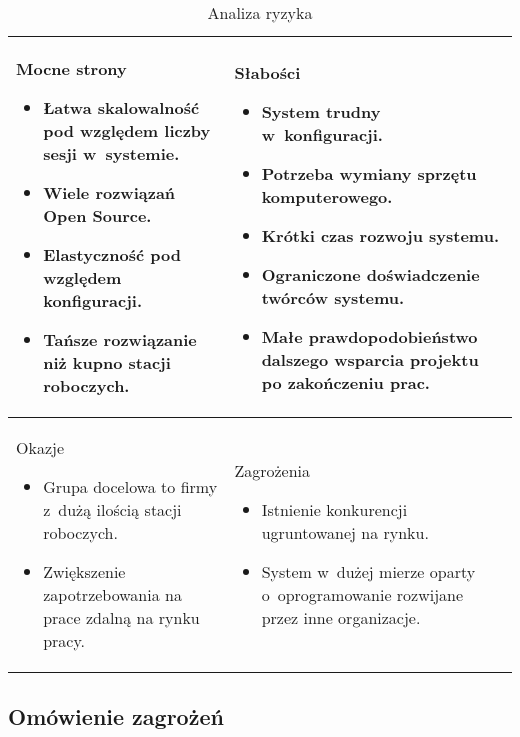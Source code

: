 \documentclass[../wstep.tex]{subfiles}
\begin{document}
\begin{table}[H]
    \caption[Analiza ryzyka]{Analiza ryzyka}
    \label{risk-analysis}
    \centering
    \begin{tabular}{| p{} | p{} |}
        \hline
        Mocne strony
        \begin{itemize}
            \item Łatwa skalowalność pod względem liczby sesji w~systemie.
            \item Wiele rozwiązań Open Source.
            \item Elastyczność pod względem konfiguracji.
            \item Tańsze rozwiązanie niż kupno stacji roboczych.
        \end{itemize}
         &
        Słabości
        \begin{itemize}
            \item System trudny w~konfiguracji.
            \item Potrzeba wymiany sprzętu komputerowego.
            \item Krótki czas rozwoju systemu.
            \item Ograniczone doświadczenie twórców systemu.
            \item Małe prawdopodobieństwo dalszego wsparcia projektu po zakończeniu prac.
        \end{itemize}
        \\ \hline

        Okazje
        \begin{itemize}
            \item Grupa docelowa to firmy z~dużą ilością stacji roboczych.
            \item Zwiększenie zapotrzebowania na prace zdalną na rynku pracy.
        \end{itemize}
         &

        Zagrożenia
        \begin{itemize}
            \item Istnienie konkurencji ugruntowanej na rynku.
            \item System w~dużej mierze oparty o~oprogramowanie rozwijane przez inne organizacje.
        \end{itemize}
        \\ \hline
    \end{tabular}
\end{table}

\subsection{Omówienie zagrożeń}
\end{document}
